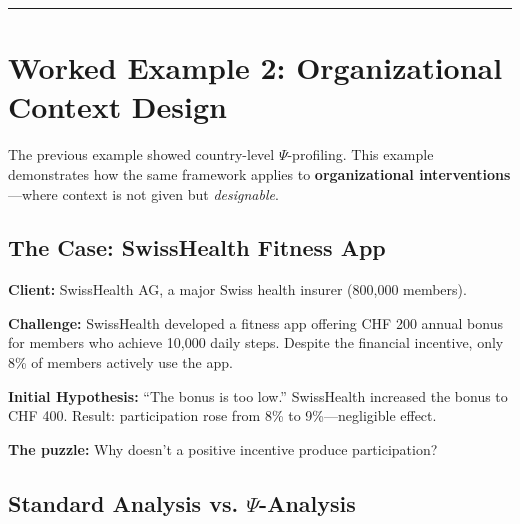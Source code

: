 \begin{center}
\end{center}

\vspace{1em}
\hrule
\vspace{0.5em}


\section{Worked Example 2: Organizational Context Design}
\label{sec:V-example-org}

The previous example showed country-level $\Psi$-profiling. This example demonstrates
how the same framework applies to \textbf{organizational interventions}---where context
is not given but \textit{designable}.

\subsection{The Case: SwissHealth Fitness App}

\textbf{Client:} SwissHealth AG, a major Swiss health insurer (800,000 members).

\textbf{Challenge:} SwissHealth developed a fitness app offering CHF 200 annual bonus
for members who achieve 10,000 daily steps. Despite the financial incentive, only 8\%
of members actively use the app.

\textbf{Initial Hypothesis:} ``The bonus is too low.'' SwissHealth increased the bonus
to CHF 400. Result: participation rose from 8\% to 9\%---negligible effect.

\textbf{The puzzle:} Why doesn't a positive incentive produce participation?

\subsection{Standard Analysis vs. $\Psi$-Analysis}

